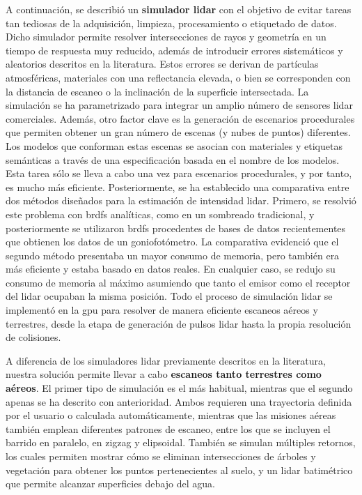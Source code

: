 A continuación, se describió un \textbf{simulador \acrshort{lidar}} con el objetivo de evitar tareas tan tediosas de la adquisición, limpieza, procesamiento o etiquetado de datos. Dicho simulador permite resolver intersecciones de rayos y geometría en un tiempo de respuesta muy reducido, además de introducir errores sistemáticos y aleatorios descritos en la literatura. Estos errores se derivan de partículas atmosféricas, materiales con una reflectancia elevada, o bien se corresponden con la distancia de escaneo o la inclinación de la superficie intersectada. La simulación se ha parametrizado para integrar un amplio número de sensores \acrshort{lidar} comerciales. Además, otro factor clave es la generación de escenarios procedurales que permiten obtener un gran número de escenas (y nubes de puntos) diferentes. Los modelos que conforman estas escenas se asocian con materiales y etiquetas semánticas a través de una especificación basada en el nombre de los modelos. Esta tarea sólo se lleva a cabo una vez para escenarios procedurales, y por tanto, es mucho más eficiente. Posteriormente, se ha establecido una comparativa entre dos métodos diseñados para la estimación de intensidad \acrshort{lidar}. Primero, se resolvió este problema con \acrshort{brdf}s analíticas, como en un sombreado tradicional, y posteriormente se utilizaron \acrshort{brdf}s procedentes de bases de datos recientementes que obtienen los datos de un goniofotómetro. La comparativa evidenció que el segundo método presentaba un mayor consumo de memoria, pero también era más eficiente y estaba basado en datos reales. En cualquier caso, se redujo su consumo de memoria al máximo asumiendo que tanto el emisor como el receptor del \acrshort{lidar} ocupaban la misma posición. Todo el proceso de simulación \acrshort{lidar} se implementó en la \acrshort{gpu} para resolver de manera eficiente escaneos aéreos y terrestres, desde la etapa de generación de pulsos \acrshort{lidar} hasta la propia resolución de colisiones.

A diferencia de los simuladores \acrshort{lidar} previamente descritos en la literatura, nuestra solución permite llevar a cabo \textbf{escaneos tanto terrestres como aéreos}. El primer tipo de simulación es el más habitual, mientras que el segundo apenas se ha descrito con anterioridad. Ambos requieren una trayectoria definida por el usuario o calculada automáticamente, mientras que las misiones aéreas también emplean diferentes patrones de escaneo, entre los que se incluyen el barrido en paralelo, en zigzag y elipsoidal. También se simulan múltiples retornos, los cuales permiten mostrar cómo se eliminan intersecciones de árboles y vegetación para obtener los puntos pertenecientes al suelo, y un \acrshort{lidar} batimétrico que permite alcanzar superficies debajo del agua. 

